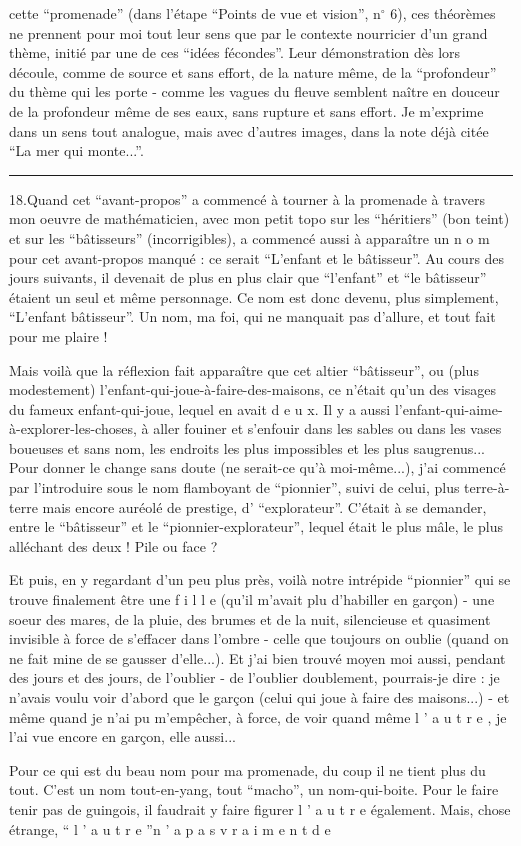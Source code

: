 cette ``promenade'' (dans l'étape ``Points de vue et vision'', n$^\circ$ 6), ces théorèmes ne prennent pour moi tout leur sens que par le contexte nourricier d'un grand thème, initié par une de ces ``idées fécondes''. Leur démonstration dès lors découle, comme de source et sans effort, de la nature même, de la ``profondeur'' du thème qui les porte - comme les vagues du fleuve semblent naître en douceur de la profondeur même de ses eaux, sans rupture et sans effort. Je m'exprime dans un sens tout analogue, mais avec d'autres images, dans la note déjà citée ``La mer qui monte...''.

\noindent\rule{2.1cm}{0.4pt}

18.\quad Quand cet ``avant-propos'' a commencé à tourner à la promenade à travers mon oeuvre de mathématicien, avec mon petit topo sur les ``héritiers'' (bon teint) et sur les ``bâtisseurs'' (incorrigibles), a commencé aussi à apparaître un n o m pour cet avant-propos manqué : ce serait ``L'enfant et le bâtisseur''. Au cours des jours suivants, il devenait de plus en plus clair que ``l'enfant'' et ``le bâtisseur'' étaient un seul et même personnage. Ce nom est donc devenu, plus simplement, ``L'enfant bâtisseur''. Un nom, ma foi, qui ne manquait pas d'allure, et tout fait pour me plaire !

Mais voilà que la réflexion fait apparaître que cet altier ``bâtisseur'', ou (plus modestement) l'enfant-qui-joue-à-faire-des-maisons, ce n'était qu'un des visages du fameux enfant-qui-joue, lequel en avait d e u x. Il y a aussi l'enfant-qui-aime-à-explorer-les-choses, à aller fouiner et s'enfouir dans les sables ou dans les vases boueuses et sans nom, les endroits les plus impossibles et les plus saugrenus... Pour donner le change sans doute (ne serait-ce qu'à moi-même...), j'ai commencé par l'introduire sous le nom flamboyant de ``pionnier'', suivi de celui, plus terre-à-terre mais encore auréolé de prestige, d' ``explorateur''. C'était à se demander, entre le ``bâtisseur'' et le ``pionnier-explorateur'', lequel était le plus mâle, le plus alléchant des deux ! Pile ou face ?

Et puis, en y regardant d'un peu plus près, voilà notre intrépide ``pionnier'' qui se trouve finalement être une f i l l e (qu'il m'avait plu d'habiller en garçon) - une soeur des mares, de la pluie, des brumes et de la nuit, silencieuse et quasiment invisible à force de s'effacer dans l'ombre - celle que toujours on oublie (quand on ne fait mine de se gausser d'elle...). Et j'ai bien trouvé moyen moi aussi, pendant des jours et des jours, de l'oublier - de l'oublier doublement, pourrais-je dire : je n'avais voulu voir d'abord que le garçon (celui qui joue à faire des maisons...) - et même quand je n'ai pu m'empêcher, à force, de voir quand même l ' a u t r e , je l'ai vue encore en garçon, elle aussi...

Pour ce qui est du beau nom pour ma promenade, du coup il ne tient plus du tout. C'est un nom tout-en-yang, tout ``macho'', un nom-qui-boite. Pour le faire tenir pas de guingois, il faudrait y faire figurer l ' a u t r e également. Mais, chose étrange, `` l ' a u t r e ''\quad n ' a \quad p a s \quad v r a i m e n t \quad d e

